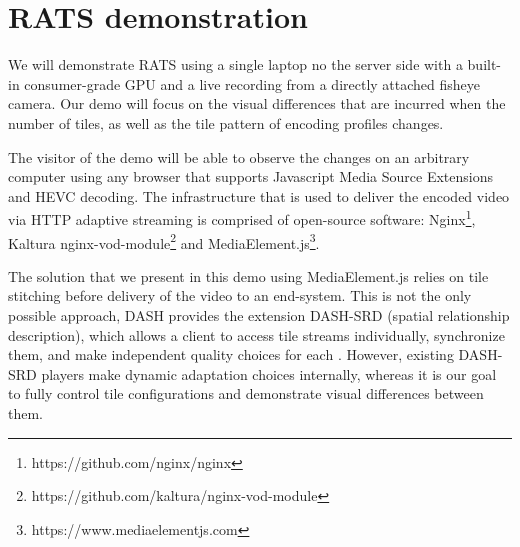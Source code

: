 \section{RATS demonstration} \label{infra}

We will demonstrate RATS using a single laptop no the server side with a built-in consumer-grade GPU and a live recording from a directly attached fisheye camera. Our demo will focus on the visual differences that are incurred when the number of tiles, as well as the tile pattern of encoding profiles changes.

The visitor of the demo will be able to observe the changes on an arbitrary computer using any browser that supports Javascript Media Source Extensions and HEVC decoding.
The infrastructure that is used to deliver the encoded video via HTTP adaptive streaming is comprised of open-source software: Nginx\footnote{https://github.com/nginx/nginx}, Kaltura nginx-vod-module\footnote{https://github.com/kaltura/nginx-vod-module} and MediaElement.js\footnote{https://www.mediaelementjs.com}.

The solution that we present in this demo using MediaElement.js relies on tile stitching before delivery of the video to an end-system.	
This is not the only possible approach, DASH provides the extension DASH-SRD (spatial relationship description), which allows a client to access tile streams individually, synchronize them, and make independent quality choices for each \cite{niamut2016}.
However, existing DASH-SRD players make dynamic adaptation choices internally, whereas it is our goal to fully control tile configurations and demonstrate visual differences between them.



